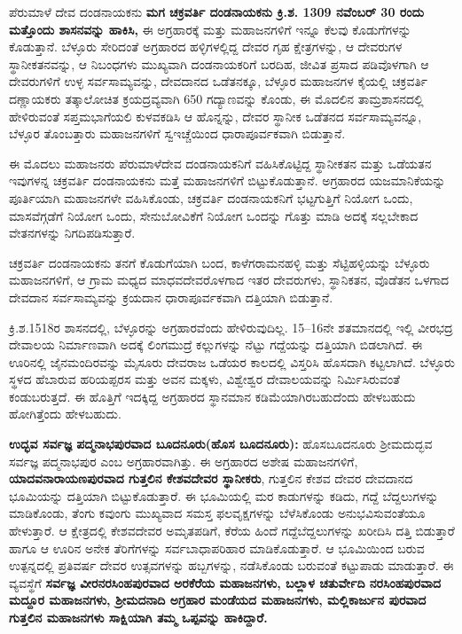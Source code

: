 ಪೆರುಮಾಳೆ ದೇವ ದಂಡನಾಯಕನು \textbf{ಮಗ ಚಕ್ರವರ್ತಿ ದಂಡನಾಯಕನು ಕ್ರಿ.ಶ. 1309 ನವೆಂಬರ್​ 30 ರಂದು ಮತ್ತೊಂದು ಶಾಸನವನ್ನು ಹಾಕಿಸಿ, }ಈ ಅಗ್ರಹಾರಕ್ಕೆ ಮತ್ತು ಮಹಾಜನಗಳಿಗೆ ಇನ್ನೂ ಕೆಲವು ಕೊಡುಗೆಗಳನ್ನು ಕೊಡುತ್ತಾನೆ. ಬೆಳ್ಳೂರು ಸೇರಿದಂತೆ ಅಗ್ರಹಾರದ ಹಳ್ಳಿಗಳಲ್ಲಿದ್ದ ದೇವರ ಗೃಹ ಕ್ಷೇತ್ರಗಳನ್ನು, ಆ ದೇವರುಗಳ ಸ್ಥಾನೀಕತನವನ್ನು, ಆ ನಿಬಂಧಗಳು ಮುಖ್ಯವಾಗಿ ದಂಡನಾಯಕರಿಗೆ ಬರದಿಹ, ಜೀವಿತ ಪ್ರಸಾದ ಪಡಿವೊಳಗಾಗಿ ಆ ದೇವರುಗಳಿಗೆ ಉಳ್ಳ ಸರ್ವಸಾಮ್ಯವನ್ನು, ದೇವದಾನದ ಒಡೆತನಕ್ಕೂ, ಬೆಳ್ಳೂರ ಮಹಾಜನಗಳ ಕೈಯಲ್ಲಿ ಚಕ್ರವರ್ತಿ ದಣ್ಣಾಯಕರು ತತ್ಕಾಲೋಚಿತ ಕ್ರಯದ್ರವ್ಯವಾಗಿ 650 ಗದ್ಯಾಣವನ್ನು ಕೊಂಡು, ಈ ಮೊದಲಿನ ತಾಮ್ರಶಾಸನದಲ್ಲಿ ಹೇಳಿರುವಂತೆ ಸಪ್ತಮಭಾಗೆಯಲಿ ಕುಳವಕಡಿಸಿ ಆ ಹೊನ್ನನ್ನು, ದೇವರ ಸ್ಥಾನೀಕ ಒಡೆತನದ ಸರ್ವಸಾಮ್ಯವನ್ನೂ, ಬೆಳ್ಳೂರ ತೊಂಬತ್ತಾರು ಮಹಾಜನಗಳಿಗೆ ಸ್ವಇಚ್ಚೆಯಿಂದ ಧಾರಾಪೂರ್ವಕವಾಗಿ ಬಿಡುತ್ತಾನೆ.

ಈ ಮೊದಲು ಮಹಾಜನರು ಪೆರುಮಾಳೆದೇವ ದಂಡನಾಯಕನಿಗೆ ವಹಿಸಿಕೊಟ್ಟಿದ್ದ ಸ್ಥಾನೀಕತನ ಮತ್ತು ಒಡೆಯತನ ಇವುಗಳನ್ನ ಚಕ್ರವರ್ತಿ ದಂಡನಾಯಕನು ಮತ್ತೆ ಮಹಾಜನಗಳಿಗೆ ಬಿಟ್ಟುಕೊಡುತ್ತಾನೆ. ಅಗ್ರಹಾರದ ಯಜಮಾನಿಕೆಯನ್ನು ಪೂರ್ತಿಯಾಗಿ ಮಹಾಜನಗಳೇ ವಹಿಸಿಕೊಂಡು, ಚಕ್ರವರ್ತಿ ದಂಡನಾಯಕನಿಗೆ ಭಟ್ಟಗುತ್ತಿಗೆ ನಿಯೋಗ ಒಂದು, ಮಾಸವೆಗ್ಗಡೆಗೆ ನಿಯೋಗ ಒಂದು, ಸೇನುಬೋವಿಕೆಗೆ ನಿಯೋಗ ಒಂದನ್ನು ಗೊತ್ತು ಮಾಡಿ ಅದಕ್ಕೆ ಸಲ್ಲಬೇಕಾದ ವೇತನಗಳನ್ನು ನಿಗದಿಪಡಿಸುತ್ತಾರೆ.

ಚಕ್ರವರ್ತಿ ದಂಡನಾಯಕನು ತನಗೆ ಕೊಡುಗೆಯಾಗಿ ಬಂದ, ಕಾಳೆಗರಾಮನಹಳ್ಳಿ ಮತ್ತು ಸೆಟ್ಟಿಹಳ್ಳಿಯನ್ನು ಬೆಳ್ಳೂರು ಮಹಾಜನಗಳಿಗೆ, ಆ ಗ್ರಾಮ ಮಧ್ಯದ ಮಾಧವದೇವರೊಳಗಾದ ಇತರ ದೇವರುಗಳು, ಸ್ಥಾನಿಕತನ, ವೊಡೆತನ ಒಳಗಾದ ದೇವದಾನ ಸರ್ವಸಾಮ್ಯವನ್ನು ಕ್ರಯದಾನ ಧಾರಾಪೂರ್ವಕವಾಗಿ ದತ್ತಿಯಾಗಿ ಬಿಡುತ್ತಾನೆ.

ಕ್ರಿ.ಶ.1518ರ ಶಾಸನದಲ್ಲಿ, ಬೆಳ್ಳೂರನ್ನು ಅಗ್ರಹಾರವೆಂದು ಹೇಳಿರುವುದಿಲ್ಲ. 15–16ನೇ ಶತಮಾನದಲ್ಲಿ ಇಲ್ಲಿ ವೀರಭದ್ರ ದೇವಾಲಯ ನಿರ್ಮಾಣವಾಗಿ ಅದಕ್ಕೆ ಲಿಂಗಮುದ್ರೆ ಕಲ್ಲುಗಳನ್ನು ನೆಟ್ಟು ಗದ್ದೆಯನ್ನು ದತ್ತಿಯಾಗಿ ಬಿಡಲಾಗಿದೆ. ಈ ಊರಿನಲ್ಲಿ ಜೈನಮಂದಿರವನ್ನು ಮೈಸೂರು ದೇವರಾಜ ಒಡೆಯರ ಕಾಲದಲ್ಲಿ ವಿಸ್ತರಿಸಿ ಹೊಸದಾಗಿ ಕಟ್ಟಲಾಗಿದೆ. ಬೆಳ್ಳೂರು ಸ್ಥಳದ ಹೆಬಾರುವ ಹರಿಯಪ್ಪರಸ ಮತ್ತು ಅವನ ಮಕ್ಕಳು, ವಿಶ್ವೇಶ್ವರ ದೇವಾಲಯವನ್ನು ನಿರ್ಮಿಸಿರುವಂತೆ ಕಂಡುಬರುತ್ತದೆ. ಈ ಹೊತ್ತಿಗೆ ಇದಕ್ಕಿದ್ದ ಅಗ್ರಹಾರದ ಸ್ಥಾನಮಾನ ಕಡಿಮೆಯಾಗಿರಬಹುದೆಂದು ಹೇಳಬಹುದು ಹೋಗಿತ್ತೆಂದು ಹೇಳಬಹುದು.

\textbf{ಉದ್ಭವ ಸರ್ವಜ್ಞ ಪದ್ಮನಾಭಪುರವಾದ ಬೂದನೂರು(ಹೊಸ ಬೂದನೂರು):} ಹೊಸಬೂದನೂರು ಶ‍್ರೀಮದುದ್ಭವ ಸರ್ವಜ್ಞ ಪದ್ಮನಾಭಪುರ ಎಂಬ ಅಗ್ರಹಾರವಾಗಿತ್ತು. ಈ ಅಗ್ರಹಾರದ ಅಶೇಷ ಮಹಾಜನಗಳಿಗೆ, \textbf{ಯಾದವನಾರಾಯಣಪುರವಾದ ಗುತ್ತಲಿನ ಕೇಶವದೇವರ ಸ್ಥಾನೀಕರು}, ಗುತ್ತಲಿನ ಕೇಶವ ದೇವರ ದೇವದಾನದ ಭೂಮಿಯನ್ನು ದತ್ತಿಯಾಗಿ ಬಿಟ್ಟುಕೊಡುತ್ತಾರೆ. ಈ ಭೂಮಿಯಲ್ಲಿ ಮರ ಕಾಡುಗಳನ್ನು ಕಡಿದು, ಗದ್ದೆ ಬೆದ್ದಲುಗಳನ್ನು ಮಾಡಿಕೊಂಡು, ತೆಂಗು ಕವುಂಗು ಮುಖ್ಯವಾದ ಸಮಸ್ತ ಫಲವೃಕ್ಷಗಳನ್ನು ಬೆಳೆಸಿಕೊಂಡು ಅನುಭವಿಸುವಂತೆಯೂ ಹೇಳುತ್ತಾರೆ. ಆ ಕ್ಷೇತ್ರದಲ್ಲಿ ಕೇಶವದೇವರ ಅಮೃತಪಡಿಗೆ, ಕೆರೆಯ ಹಿಂದೆ ಗದ್ದೆಬೆದ್ದಲುಗಳನ್ನು ಖರೀದಿಸಿ ದತ್ತಿ ಬಿಡುತ್ತಾರೆ ಹಾಗೂ ಆ ಊರಿನ ಅನೇಕ ತೆರಿಗೆಗಳನ್ನು ಸರ್ವಬಾಧಾಪರಿಹಾರ ಮಾಡಿಕೊಡುತ್ತಾರೆ. ಆ ಭೂಮಿಯಿಂದ ಬರುವ ಉತ್ಪನ್ನದಲ್ಲಿ ಪ್ರತಿವರ್ಷ ದೇವರ ಉತ್ಸವಗಳನ್ನು ಹಬ್ಬಗಳನ್ನು, ನಡೆಸಿಕೊಂಡು ಬರುವಂತೆ ಕಟ್ಟುಪಾಡು ಮಾಡುತ್ತಾರೆ. ಈ ವ್ಯವಸ್ಥೆಗೆ \textbf{ಸರ್ವಜ್ಞ ವೀರನರಸಿಂಹಪುರವಾದ ಅರಕೆರೆಯ ಮಹಾಜನಗಳು, ಬಲ್ಲಾಳ ಚತುರ್ವೇದಿ ನರಸಿಂಹಪುರವಾದ ಮದ್ದೂರ ಮಹಾಜನಗಳು, ಶ‍್ರೀಮದನಾದಿ ಅಗ್ರಹಾರ ಮಂಡೆಯದ ಮಹಾಜನಗಳು, ಮಲ್ಲಿಕಾರ್ಜುನ ಪುರವಾದ ಗುತ್ತಲಿನ ಮಹಾಜನಗಳು ಸಾಕ್ಷಿಯಾಗಿ ತಮ್ಮ ಒಪ್ಪವನ್ನು ಹಾಕಿದ್ದಾರೆ.}


